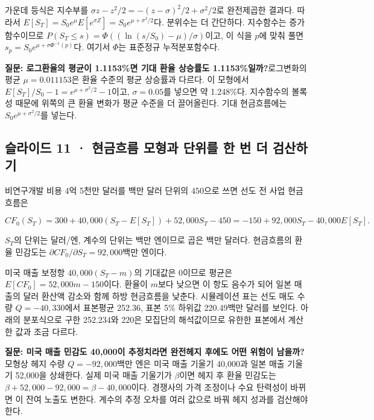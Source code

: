 \documentclass[11pt,a4paper]{article}
\begin{document}
가운데 등식은 지수부를 $\sigma z-z^2/2=-(z-\sigma)^2/2+\sigma^2/2$로 완전제곱한 결과다. 따라서 $E[S_T]=S_0e^\mu E[e^{\sigma Z}]=S_0e^{\mu+\sigma^2/2}$다. 분위수는 더 간단하다. 지수함수는 증가함수이므로 $P(S_T\le s)=\Phi((\ln(s/S_0)-\mu)/\sigma)$이고, 이 식을 $p$에 맞춰 풀면 $s_p=S_0e^{\mu+\sigma\Phi^{-1}(p)}$다. 여기서 $\Phi$는 표준정규 누적분포함수다.\par

\par\medskip\noindent\textbf{질문: 로그환율의 평균이 1.1153\%면 기대 환율 상승률도 1.1153\%일까?}\quad 로그변화의 평균 $\mu=0.011153$은 환율 수준의 평균 상승률과 다르다. 이 모형에서 $E[S_T]/S_0-1=e^{\mu+\sigma^2/2}-1$이고, $\sigma=0.05$를 넣으면 약 1.248\%다. 지수함수의 볼록성 때문에 위쪽의 큰 환율 변화가 평균 수준을 더 끌어올린다. 기대 현금흐름에는 $S_0e^{\mu+\sigma^2/2}$를 넣는다.\par

\subsection{슬라이드 11 · 현금흐름 모형과 단위를 한 번 더 검산하기}
비연구개발 비용 4억 5천만 달러를 백만 달러 단위의 $450$으로 쓰면 선도 전 사업 현금흐름은\par

\[
CF_0(S_T)=300+40{,}000(S_T-E[S_T])+52{,}000S_T-450
=-150+92{,}000S_T-40{,}000E[S_T].
\]

$S_T$의 단위는 달러/엔, 계수의 단위는 백만 엔이므로 곱은 백만 달러다. 현금흐름의 환율 민감도는 $\partial CF_0/\partial S_T=92{,}000$백만 엔이다.\par

미국 매출 보정항 $40{,}000(S_T-m)$의 기대값은 0이므로 평균은 $E[CF_0]=52{,}000m-150$이다. 환율이 $m$보다 낮으면 이 항도 음수가 되어 일본 매출의 달러 환산액 감소와 함께 하방 현금흐름을 낮춘다. 시뮬레이션 표는 선도 매도 수량 $Q=-40{,}330$에서 표본평균 252.36, 표본 5\% 하위값 220.49백만 달러를 보인다. 아래의 분포식으로 구한 252.234와 220은 모집단의 해석값이므로 유한한 표본에서 계산한 값과 조금 다르다.\par

\par\medskip\noindent\textbf{질문: 미국 매출 민감도 40,000이 추정치라면 완전헤지 후에도 어떤 위험이 남을까?}\quad 모형상 헤지 수량 $Q=-92{,}000$백만 엔은 미국 매출 기울기 40,000과 일본 매출 기울기 52,000을 상쇄한다. 실제 미국 매출 기울기가 $\beta$이면 헤지 후 환율 민감도는 $\beta+52{,}000-92{,}000=\beta-40{,}000$이다. 경쟁사의 가격 조정이나 수요 탄력성이 바뀌면 이 잔여 노출도 변한다. 계수의 추정 오차를 여러 값으로 바꿔 헤지 성과를 검산해야 한다.\par
\end{document}
